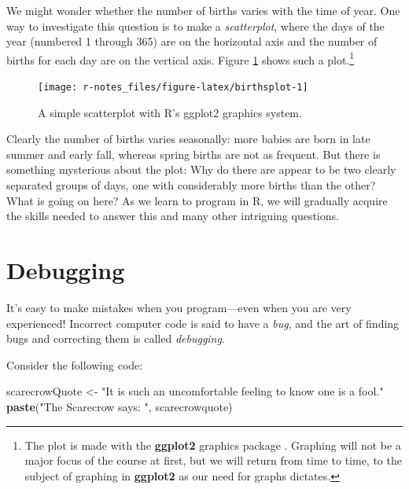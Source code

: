 \documentclass[]{book}
\makeatletter
\newenvironment{Shaded}{\begin{snugshade}}{\end{snugshade}}
\newcommand{\KeywordTok}[1]{\textcolor[rgb]{0.13,0.29,0.53}{\textbf{{#1}}}}
\newcommand{\StringTok}[1]{\textcolor[rgb]{0.31,0.60,0.02}{{#1}}}
\newcommand{\NormalTok}[1]{{#1}}
\let\rmarkdownfootnote\footnote%
\def\footnote{\protect\rmarkdownfootnote}
\newenvironment{kframe}{%
\medskip{}
\setlength{\fboxsep}{.8em}
 \def\at@end@of@kframe{}%
 \ifinner\ifhmode%
  \def\at@end@of@kframe{\end{minipage}}%
  \begin{minipage}{\columnwidth}%
 \fi\fi%
 \def\FrameCommand##1{\hskip\@totalleftmargin \hskip-\fboxsep
 \colorbox{shadecolor}{##1}\hskip-\fboxsep
     \hskip-\linewidth \hskip-\@totalleftmargin \hskip\columnwidth}%
 \MakeFramed {\advance\hsize-\width
   \@totalleftmargin\z@ \linewidth\hsize
   \@setminipage}}%
 {\par\unskip\endMakeFramed%
 \at@end@of@kframe}
\renewenvironment{Shaded}{\begin{kframe}}{\end{kframe}}
\theoremstyle{definition}
\theoremstyle{definition}
\theoremstyle{remark}
\makeatother
\begin{document}
We might wonder whether the number of births varies with the time of
year. One way to investigate this question is to make a
\emph{scatterplot}, where the days of the year (numbered 1 through 365)
are on the horizontal axis and the number of births for each day are on
the vertical axis. Figure \ref{fig:birthsplot} shows such a
plot.\footnote{The plot is made with the \textbf{ggplot2} graphics
  package \citep{R-ggplot2}. Graphing will not be a major focus of the
  course at first, but we will return from time to time, to the subject
  of graphing in \textbf{ggplot2} as our need for graphs dictates.}

\begin{figure}

{\centering \texttt{[image: r-notes\_files/figure-latex/birthsplot-1]} 

}

\caption{A simple scatterplot with R's ggplot2 graphics system.}\label{fig:birthsplot}
\end{figure}

Clearly the number of births varies seasonally: more babies are born in
late summer and early fall, whereas spring births are not as frequent.
But there is something mysterious about the plot: Why do there are
appear to be two clearly separated groups of days, one with considerably
more births than the other? What is going on here? As we learn to
program in R, we will gradually acquire the skills needed to answer this
and many other intriguing questions.

\section{Debugging}\label{idea-debugging}

It's easy to make mistakes when you program---even when you are very
experienced! Incorrect computer code is said to have a \emph{bug}, and
the art of finding bugs and correcting them is called \emph{debugging}.

Consider the following code:

\begin{Shaded}
\begin{Highlighting}[]
\NormalTok{scarecrowQuote <-}\StringTok{ "It is such an uncomfortable feeling to know one is a fool."}
\KeywordTok{paste}\NormalTok{(}\StringTok{"The Scarecrow says: "}\NormalTok{, scarecrowquote)}
\end{Highlighting}
\end{Shaded}
\end{document}
